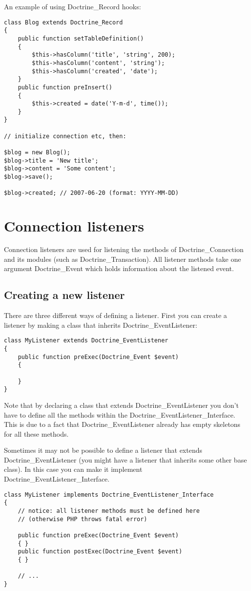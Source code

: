 \documentclass[11pt,a4paper]{report}
\begin{document}
An example of using Doctrine\_Record hooks:

\begin{verbatim}
class Blog extends Doctrine_Record
{
    public function setTableDefinition()
    {
        $this->hasColumn('title', 'string', 200);
        $this->hasColumn('content', 'string');
        $this->hasColumn('created', 'date');
    }
    public function preInsert()
    {
        $this->created = date('Y-m-d', time());
    }
}

// initialize connection etc, then:

$blog = new Blog();
$blog->title = 'New title';
$blog->content = 'Some content';
$blog->save();

$blog->created; // 2007-06-20 (format: YYYY-MM-DD)
\end{verbatim}

\section{Connection listeners}
Connection listeners are used for listening the methods of Doctrine\_Connection and its modules (such as Doctrine\_Transaction). All listener methods take one argument Doctrine\_Event which holds information about the listened event.

\subsection{Creating a new listener}
There are three different ways of defining a listener. First you can create a listener by making a class that inherits Doctrine\_EventListener:

\begin{verbatim}
class MyListener extends Doctrine_EventListener
{
    public function preExec(Doctrine_Event $event)
    {

    }
}
\end{verbatim}

Note that by declaring a class that extends Doctrine\_EventListener you don't have to define all the methods within the Doctrine\_EventListener\_Interface. This is due to a fact that Doctrine\_EventListener already has empty skeletons for all these methods.

Sometimes it may not be possible to define a listener that extends Doctrine\_EventListener (you might have a listener that inherits some other base class). In this case you can make it implement Doctrine\_EventListener\_Interface.

\begin{verbatim}
class MyListener implements Doctrine_EventListener_Interface
{
    // notice: all listener methods must be defined here
    // (otherwise PHP throws fatal error)

    public function preExec(Doctrine_Event $event)
    { }
    public function postExec(Doctrine_Event $event)
    { }

    // ...
}
\end{verbatim}
\end{document}

